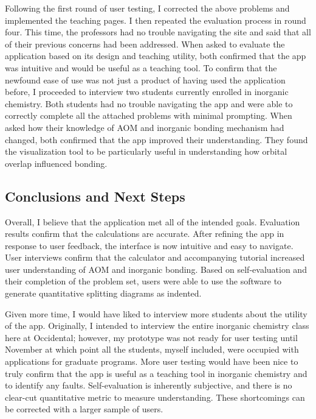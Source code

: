 \documentclass[10pt,twocolumn]{article}
\begin{document}
Following the first round of user testing, I corrected the above problems and implemented the teaching pages. I then repeated the evaluation process in round four. This time, the professors had no trouble navigating the site and said that all of their previous concerns had been addressed. When asked to evaluate the application based on its design and teaching utility, both confirmed that the app was intuitive and would be useful as a teaching tool. To confirm that the newfound ease of use was not just a product of having used the application before, I proceeded to interview two students currently enrolled in inorganic chemistry. Both students had no trouble navigating the app and were able to correctly complete all the attached problems with minimal prompting. When asked how their knowledge of AOM and inorganic bonding mechanism had changed, both confirmed that the app improved their understanding. They found the visualization tool to be particularly useful in understanding how orbital overlap influenced bonding. 

\subsection{Conclusions and Next Steps}
Overall, I believe that the application met all of the intended goals. Evaluation results confirm that the calculations are accurate. After refining the app in response to user feedback, the interface is now intuitive and easy to navigate. User interviews confirm that the calculator and accompanying tutorial increased user understanding of AOM and inorganic bonding. Based on self-evaluation and their completion of the problem set, users were able to use the software to generate quantitative splitting diagrams as indented.

Given more time, I would have liked to interview more students about the utility of the app. Originally, I intended to interview the entire inorganic chemistry class here at Occidental; however, my prototype was not ready for user testing until November at which point all the students, myself included, were occupied with applications for graduate programs. More user testing would have been nice to truly confirm that the app is useful as a teaching tool in inorganic chemistry and to identify any faults. Self-evaluation is inherently subjective, and there is no clear-cut quantitative metric to measure understanding. These shortcomings can be corrected with a larger sample of users.
\end{document}
